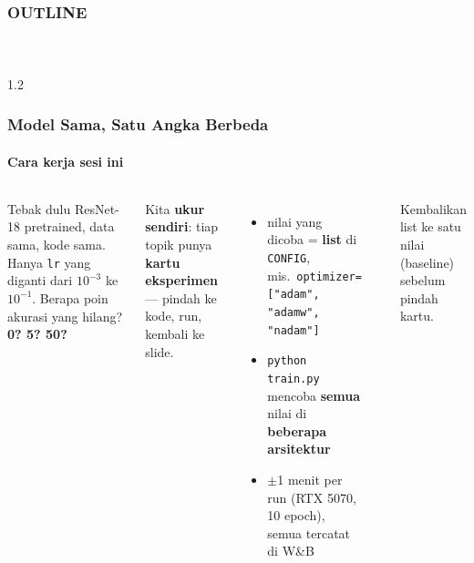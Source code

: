 \documentclass[t,aspectratio=169,xcolor={dvipsnames,table}]{beamer}
\begin{document}
\begin{frame}[plain]
    \frametitle{OUTLINE}
    \framesubtitle{~}
    \begin{spacing}{1.2}
        \tableofcontents
    \end{spacing}
\end{frame}

\begin{frame}
    \frametitle{Model Sama, Satu Angka Berbeda}
    \framesubtitle{Cara kerja sesi ini}
    \footnotesize

    \begin{columns}[T]
        \begin{exampleblock}{Tebak dulu}
            ResNet-18 pretrained, data sama, kode sama. Hanya \texttt{lr} yang diganti dari $10^{-3}$ ke $10^{-1}$.
            Berapa poin akurasi yang hilang? \textbf{0? 5? 50?}
        \end{exampleblock}
        \vspace{0.1cm}
        Kita \textbf{ukur sendiri}: tiap topik punya \textbf{kartu eksperimen} --- pindah ke kode, run, kembali ke slide.
        \begin{itemize}
            \item nilai yang dicoba = \textbf{list} di \texttt{CONFIG}, mis.\ \texttt{optimizer=["adam", "adamw", "nadam"]}
            \item \texttt{python train.py} mencoba \textbf{semua} nilai di \textbf{beberapa arsitektur}
            \item $\pm$1 menit per run (RTX 5070, 10 epoch), semua tercatat di W\&B
        \end{itemize}

        \begin{center}
        \end{center}
        {\scriptsize\color{dlMute} Kembalikan list ke satu nilai (baseline) sebelum pindah kartu.}
    \end{columns}
\end{frame}
\end{document}
